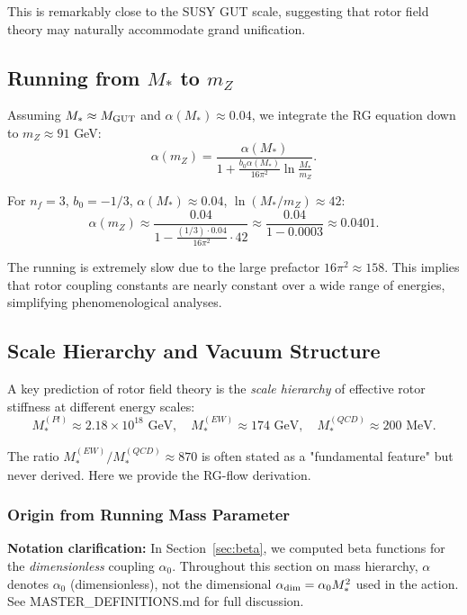 \documentclass[11pt,a4paper]{article}
\numberwithin{equation}{section}
\theoremstyle{plain}
\theoremstyle{definition}
\theoremstyle{remark}
\begin{document}
This is remarkably close to the SUSY GUT scale, suggesting that rotor field theory may naturally accommodate grand unification.

\subsection{Running from $M_*$ to $m_Z$}

Assuming $M_* \approx M_{\rm GUT}$ and $\alpha(M_*)\approx 0.04$, we integrate the RG equation down to $m_Z\approx 91$ GeV:
\begin{equation}
\alpha(m_Z) = \frac{\alpha(M_*)}{1 + \frac{b_0\alpha(M_*)}{16\pi^2}\ln\frac{M_*}{m_Z}}.
\label{eq:alpha-mZ}
\end{equation}

For $n_f=3$, $b_0=-1/3$, $\alpha(M_*)\approx 0.04$, $\ln(M_*/m_Z)\approx 42$:
\begin{equation}
\alpha(m_Z) \approx \frac{0.04}{1 - \frac{(1/3)\cdot 0.04}{16\pi^2}\cdot 42} \approx \frac{0.04}{1 - 0.0003} \approx 0.0401.
\label{eq:alpha-mZ-value}
\end{equation}

The running is extremely slow due to the large prefactor $16\pi^2\approx 158$. This implies that rotor coupling constants are nearly constant over a wide range of energies, simplifying phenomenological analyses.

\subsection{Scale Hierarchy and Vacuum Structure}\label{subsec:scale-hierarchy}

A key prediction of rotor field theory is the \emph{scale hierarchy} of effective rotor stiffness at different energy scales:
\begin{equation}
M_*^{(Pl)} \approx 2.18\times 10^{18}\text{ GeV}, \quad M_*^{(EW)} \approx 174\text{ GeV}, \quad M_*^{(QCD)} \approx 200\text{ MeV}.
\label{eq:M-hierarchy}
\end{equation}

The ratio $M_*^{(EW)}/M_*^{(QCD)} \approx 870$ is often stated as a "fundamental feature" but never derived. Here we provide the RG-flow derivation.

\subsubsection{Origin from Running Mass Parameter}

\textbf{Notation clarification:} In Section~\ref{sec:beta}, we computed beta functions for the \emph{dimensionless} coupling $\alpha_0$. Throughout this section on mass hierarchy, $\alpha$ denotes $\alpha_0$ (dimensionless), not the dimensional $\alpha_{\rm dim} = \alpha_0 M_*^2$ used in the action. See MASTER\_DEFINITIONS.md for full discussion.
\end{document}
